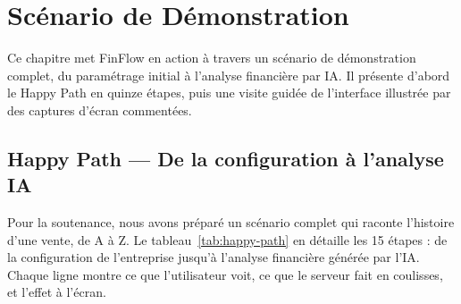 \documentclass[12pt,a4paper]{report}
\begin{document}
\chapter{Scénario de Démonstration}
\label{ch:demo}

Ce chapitre met FinFlow en action à travers un scénario de démonstration complet, du paramétrage initial à l'analyse financière par IA. Il présente d'abord le Happy Path en quinze étapes, puis une visite guidée de l'interface illustrée par des captures d'écran commentées.

\section{Happy Path — De la configuration à l'analyse IA}

Pour la soutenance, nous avons préparé un scénario complet qui raconte l'histoire d'une vente, de A à Z. Le tableau~\ref{tab:happy-path} en détaille les 15 étapes : de la configuration de l'entreprise jusqu'à l'analyse financière générée par l'IA. Chaque ligne montre ce que l'utilisateur voit, ce que le serveur fait en coulisses, et l'effet à l'écran.
\end{document}

